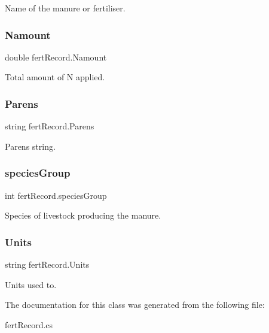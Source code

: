 Name of the manure or fertiliser. \mbox{\label{classfert_record_a60a97d66e846afeb5e5b6425d89b2427}} 
\subsubsection{\texorpdfstring{Namount}{Namount}}
{\footnotesize\ttfamily double fert\+Record.\+Namount}

Total amount of N applied. \mbox{\label{classfert_record_a4581cecf1c4f53b6809c7878c5ea75ff}} 
\subsubsection{\texorpdfstring{Parens}{Parens}}
{\footnotesize\ttfamily string fert\+Record.\+Parens}

Parens string. \mbox{\label{classfert_record_a771d65e534ff875346acaadb64052ae6}} 
\subsubsection{\texorpdfstring{speciesGroup}{speciesGroup}}
{\footnotesize\ttfamily int fert\+Record.\+species\+Group}

Species of livestock producing the manure. \mbox{\label{classfert_record_a9a4acd1daa3940bca690a0dd8a939cdb}} 
\subsubsection{\texorpdfstring{Units}{Units}}
{\footnotesize\ttfamily string fert\+Record.\+Units}

Units used to. 

The documentation for this class was generated from the following file\+:\begin{DoxyCompactItemize}
\item 
fert\+Record.\+cs\end{DoxyCompactItemize}
